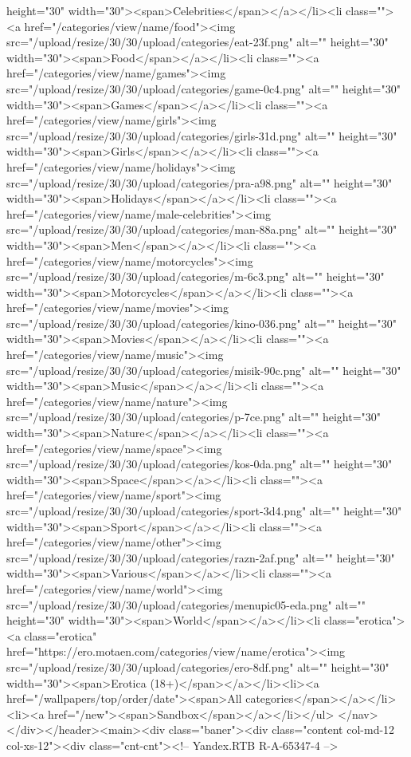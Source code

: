 height="30" width="30"><span>Celebrities</span></a></li><li class=""><a href="/categories/view/name/food"><img src="/upload/resize/30/30/upload/categories/eat-23f.png" alt="" height="30" width="30"><span>Food</span></a></li><li class=""><a href="/categories/view/name/games"><img src="/upload/resize/30/30/upload/categories/game-0c4.png" alt="" height="30" width="30"><span>Games</span></a></li><li class=""><a href="/categories/view/name/girls"><img src="/upload/resize/30/30/upload/categories/girls-31d.png" alt="" height="30" width="30"><span>Girls</span></a></li><li class=""><a href="/categories/view/name/holidays"><img src="/upload/resize/30/30/upload/categories/pra-a98.png" alt="" height="30" width="30"><span>Holidays</span></a></li><li class=""><a href="/categories/view/name/male-celebrities"><img src="/upload/resize/30/30/upload/categories/man-88a.png" alt="" height="30" width="30"><span>Men</span></a></li><li class=""><a href="/categories/view/name/motorcycles"><img src="/upload/resize/30/30/upload/categories/m-6c3.png" alt="" height="30" width="30"><span>Motorcycles</span></a></li><li class=""><a href="/categories/view/name/movies"><img src="/upload/resize/30/30/upload/categories/kino-036.png" alt="" height="30" width="30"><span>Movies</span></a></li><li class=""><a href="/categories/view/name/music"><img src="/upload/resize/30/30/upload/categories/misik-90c.png" alt="" height="30" width="30"><span>Music</span></a></li><li class=""><a href="/categories/view/name/nature"><img src="/upload/resize/30/30/upload/categories/p-7ce.png" alt="" height="30" width="30"><span>Nature</span></a></li><li class=""><a href="/categories/view/name/space"><img src="/upload/resize/30/30/upload/categories/kos-0da.png" alt="" height="30" width="30"><span>Space</span></a></li><li class=""><a href="/categories/view/name/sport"><img src="/upload/resize/30/30/upload/categories/sport-3d4.png" alt="" height="30" width="30"><span>Sport</span></a></li><li class=""><a href="/categories/view/name/other"><img src="/upload/resize/30/30/upload/categories/razn-2af.png" alt="" height="30" width="30"><span>Various</span></a></li><li class=""><a href="/categories/view/name/world"><img src="/upload/resize/30/30/upload/categories/menupic05-eda.png" alt="" height="30" width="30"><span>World</span></a></li><li class="erotica"><a class="erotica" href="https://ero.motaen.com/categories/view/name/erotica"><img src="/upload/resize/30/30/upload/categories/ero-8df.png" alt="" height="30" width="30"><span>Erotica (18+)</span></a></li><li><a href="/wallpapers/top/order/date"><span>All categories</span></a></li><li><a href="/new"><span>Sandbox</span></a></li></ul> </nav></div></header><main><div class="baner"><div class="content col-md-12 col-xs-12"><div class="cnt-cnt"><!-- Yandex.RTB R-A-65347-4 -->
